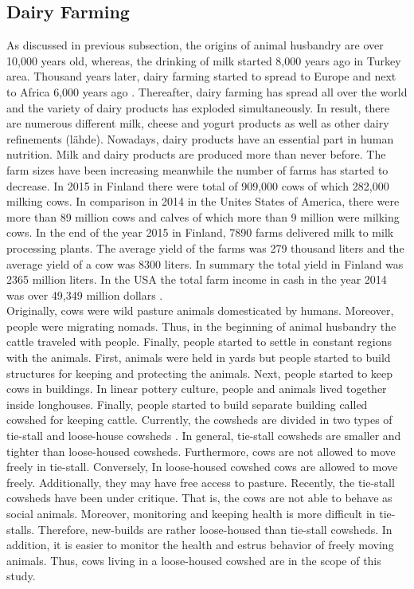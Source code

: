 \documentclass[english,12pt,a4paper,pdftex,elec,utf8]{aaltothesis}
\begin{document}
\subsection{Dairy Farming} \label{dairyfarmingsection}

As discussed in previous subsection, the origins of animal husbandry are over 10,000 years old, whereas, the drinking of milk started 8,000 years ago in Turkey area. Thousand years later, dairy farming started to spread to Europe and next to Africa 6,000 years ago \cite{ancienthistoryofmilk}. Thereafter, dairy farming has spread all over the world and the variety of dairy products has exploded simultaneously. In result, there are numerous different milk, cheese and yogurt products as well as other dairy refinements (lähde). Nowadays, dairy products have an essential part in human nutrition. Milk and dairy products are produced more than never before. The farm sizes have been increasing meanwhile the number of farms has started to decrease. In 2015 in Finland there were total of 909,000 cows of which 282,000 milking cows\cite{ruokajaluonnonvaratilastot2016}. In comparison in 2014 in the Unites States of America, there were more than 89 million cows and calves of which more than 9 million were milking cows\cite{agriculturalstatistics2015}. In the end of the year 2015 in Finland, 7890 farms delivered milk to milk processing plants. The average yield of the farms was 279 thousand liters and the average yield of a cow was 8300 liters. In summary the total yield in Finland was 2365 million liters. \cite{ruokajaluonnonvaratilastot2016} In the USA the total farm income in cash in the year 2014 was over 49,349 million dollars \cite{agriculturalstatistics2015}.\\


Originally, cows were wild pasture animals domesticated by humans. Moreover, people were migrating nomads. Thus, in the beginning of animal husbandry the cattle traveled with people. Finally, people started to settle in constant regions with the animals. First, animals were held in yards but people started to build structures for keeping and protecting the animals. Next, people started to keep cows in buildings. In linear pottery culture, people and animals lived together inside longhouses. Finally, people started to build separate building called cowshed for keeping cattle. Currently, the cowsheds are divided in two types of tie-stall and loose-house cowsheds \cite{lehmahavaintoja}. In general, tie-stall cowsheds are smaller and tighter than loose-housed cowsheds. Furthermore, cows are not allowed to move freely in tie-stall. Conversely, In loose-housed cowshed cows are allowed to move freely. Additionally, they may have free access to pasture. Recently, the tie-stall cowsheds have been under critique. That is, the cows are not able to behave as social animals. Moreover, monitoring and keeping health is more difficult in tie-stalls. Therefore, new-builds are rather loose-housed than tie-stall cowsheds. In addition, it is easier to monitor the health and estrus behavior of freely moving animals. Thus, cows living in a loose-housed cowshed are in the scope of this study. \\
\end{document}
